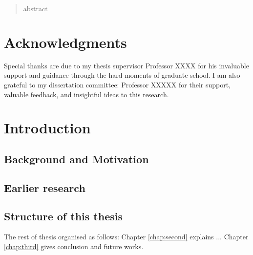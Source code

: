 \documentclass[12pt,dvipdfmx]{report}
\begin{document}
\author{Your Name}
\date{December 20XX}
\maketitle

\begin{abstract}

abstract
 
\end{abstract}

\chapter*{Acknowledgments}
\setcounter{page}{3} %

{%
\hspace{1em} Special thanks are due to my thesis supervisor Professor
XXXX for his invaluable support and guidance through the hard
moments of graduate school.
I am also grateful to my dissertation committee: Professor XXXXX for
their support, valuable feedback, and insightful ideas to this research.
}%

\tableofcontents
\listoffigures
{}
\listoftables
{}



\chapter{Introduction}
\setcounter{page}{1}   %

\section{Background and Motivation}
\section{Earlier research}
\section{Structure of this thesis}
The rest of thesis organised as follows:
Chapter \ref{chap:second} explains ... 
Chapter \ref{chap:third} gives conclusion and future works.
\end{document}

